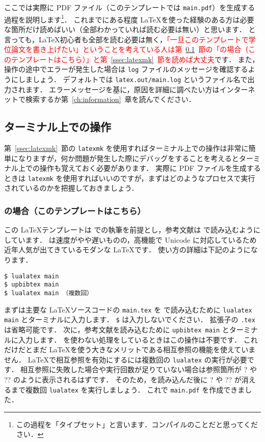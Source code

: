 ここでは実際に PDF ファイル（このテンプレートでは \verb|main.pdf|）を生成する過程を説明します\footnote{この過程を「タイプセット」と言います．コンパイルのことだと思ってください．}．
これまでにある程度 \LaTeX を使った経験のある方は必要な箇所だけ読めばいい（全部わかっていれば読む必要は無い）と思います．
と言っても，\LaTeX 初心者も全部を読む必要は無く，\textcolor{red}{「一旦このテンプレートで学位論文を書き上げたい」ということを考えている人は第~\ref{ssec:terminal}~節の「\LuaLaTeX の場合（このテンプレートはこちら）」と第~\ref{ssec:latexmk}~節を読めば大丈夫}です．
また，操作の途中でエラーが発生した場合は \verb|log| ファイルのメッセージを確認するようにしましょう．
デフォルトでは \verb|latex.out/main.log| というファイル名で出力されます．
エラーメッセージを基に，原因を詳細に調べたい方はインターネットで検索するか第~\ref{ch:information}~章を読んでください．

\subsection{ターミナル上での操作}
\label{ssec:terminal}

第~\ref{ssec:latexmk}~節の \verb|latexmk| を使用すればターミナル上での操作は非常に簡単になりますが，何か問題が発生した際にデバッグをすることを考えるとターミナル上での操作も覚えておく必要があります．
実際に PDF ファイルを生成するときは \verb|latexmk| を使用すればいいのですが，まずはどのようなプロセスで実行されているのかを把握しておきましょう．

\subsubsection*{\LuaLaTeX の場合（このテンプレートはこちら）}

この \LaTeX テンプレートは \LuaLaTeX での執筆を前提とし，参考文献は \upBibTeX で読み込むようにしています．
\LuaLaTeX は速度がやや遅いものの，高機能で Unicode に対応しているため近年人気が出てきているモダンな \LaTeX です．
使い方の詳細は下記のようになります．

\begin{tcolorbox}[title={\LuaLaTeX$+$\upBibTeX}, colback=red!5!white, colframe=red!75!black]
\begin{verbatim}
$ lualatex main
$ upbibtex main
$ lualatex main （複数回）
\end{verbatim}
\end{tcolorbox}

まずは主要な \LaTeX ソースコードの \verb|main.tex| を \LuaLaTeX で読み込むために \verb|lualatex main| とターミナルに入力します．
\verb|$| は入力しないでください．
拡張子の \verb|.tex| は省略可能です．
次に，参考文献を読み込むために \verb|upbibtex main| とターミナルに入力します．
\BibTeX を使わない処理をしているときはこの操作は不要です．
これだけだとまだ \LaTeX を使う大きなメリットである相互参照の機能を使えていません．
\LaTeX で相互参照を有効にするには複数回の \verb|lualatex| の実行が必要です．
相互参照に失敗した場合や実行回数が足りていない場合は参照箇所が ? や ?? のように表示されるはずです．
そのため，\upBibTeX を読み込んだ後に ? や ?? が消えるまで複数回 \verb|lualatex| を実行しましょう．
これで \verb|main.pdf| を作成できました．

